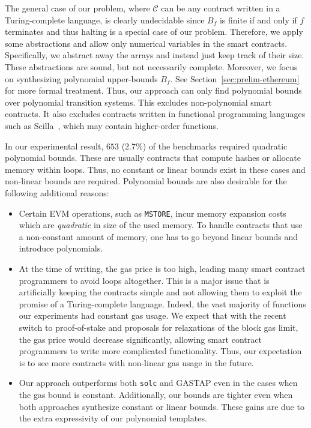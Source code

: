  The general case of our problem, where $\mathscr{C}$ can be any contract written in a Turing-complete language, is clearly undecidable since $B_f$ is finite if and only if $f$ terminates and thus halting is a special case of our problem. Therefore, we apply some abstractions and allow only numerical variables in the smart contracts. Specifically, we abstract away the arrays and instead just keep track of their size. These abstractions are sound, but not necessarily complete. Moreover, we focus on synthesizing polynomial upper-bounds $B_f$. See Section~\ref{sec:prelim-ethereum} for more formal treatment. Thus, our approach can only find polynomial bounds over polynomial transition systems. This excludes non-polynomial smart contracts. It also excludes contracts written in functional programming languages such as Scilla~\cite{sergey2019safer}, which may contain higher-order functions.


 In our experimental result, $653$ (2.7\%) of the benchmarks required quadratic polynomial bounds. These are usually contracts that compute hashes or allocate memory within loops. Thus, no constant or linear bounds exist in these cases and non-linear bounds are required. Polynomial bounds are also desirable for the following additional reasons:
\begin{itemize}
    \item Certain EVM operations, such as \texttt{MSTORE}, incur memory expansion costs which are \emph{quadratic} in size of the used memory. To handle contracts that use a non-constant amount of memory, one has to go beyond linear bounds and introduce polynomials.

    \item At the time of writing, the gas price is too high, leading many smart contract programmers to avoid loops altogether. This is a major issue that is artificially keeping the contracts simple and not allowing them to exploit the promise of a Turing-complete language. Indeed, the vast majority of functions our experiments had constant gas usage. We expect that with the recent switch to proof-of-stake and proposals for relaxations of the block gas limit, the gas price would decrease significantly, allowing smart contract programmers to write more complicated functionality. Thus, our expectation is to see more contracts with non-linear gas usage in the future.

    \item Our approach outperforms both \texttt{solc} and GASTAP even in the cases when the gas bound is constant. Additionally, our bounds are tighter even when both approaches synthesize constant or linear bounds. These gains are due to the extra expressivity of our polynomial templates.
\end{itemize}
